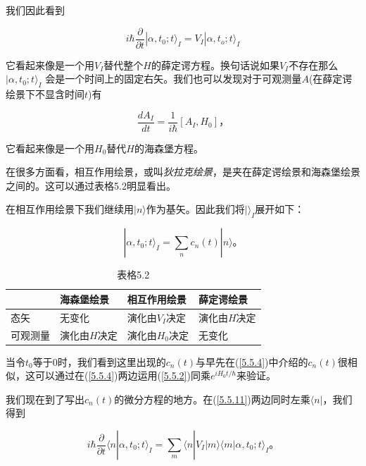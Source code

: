 ﻿\documentclass[UTF8,twoside]{ctexart}
\begin{document}
\noindent 我们因此看到

\begin{equation} \label{5.5.11}
i\hbar\dfrac{\partial}{\partial t}|\alpha,t_0;t\rangle_I=V_I|\alpha,t_o;t\rangle_I
\end{equation}

\noindent 它看起来像是一个用$V_I$替代整个$H$的薛定谔方程。换句话说如果$V_I$不存在那么$|\alpha,t_0;t\rangle_I$ 会是一个时间上的固定右矢。我们也可以发现对于可观测量$A$(在薛定谔绘景下不显含时间$t$)有

\begin{equation} \label{5.5.12}
\dfrac{dA_I}{dt}=\dfrac{1}{i\hbar}[A_I,H_0]\text{，}
\end{equation}

\noindent 它看起来像是一个用$H_0$替代$H$的海森堡方程。

在很多方面看，相互作用绘景，或叫\emph{狄拉克绘景}，是夹在薛定谔绘景和海森堡绘景之间的。这可以通过表格5.2明显看出。

在相互作用绘景下我们继续用$|n\rangle$作为基矢。因此我们将$|\rangle_I$展开如下：

\begin{equation} \label{5.5.13}
|\alpha,t_0;t\rangle_I=\displaystyle\sum_n c_n(t)|n\rangle\text{。}
\end{equation}

\begin{centering}
\begin{table}[!hbp]
\begin{tabular}{p{1.8cm}p{2.7cm}p{2.7cm}p{2.7cm}}
\hline
 & \textbf{海森堡绘景}& \textbf{相互作用绘景}& \textbf{薛定谔绘景}\\
\hline
态矢 & 无变化 & 演化由$V_I$决定 & 演化由$H$决定 \\
可观测量 & 演化由$H$决定 & 演化由$H_0$决定 & 无变化 \\
\hline
\end{tabular}
\caption{表格5.2}
\end{table}
\end{centering}

\noindent 当令$t_0$等于0时，我们看到这里出现的$c_n(t)$与早先在(\ref{5.5.4})中介绍的$c_n(t)$很相似，这可以通过在(\ref{5.5.4})两边运用(\ref{5.5.2})同乘$e^{iH_0 t/\hbar}$来验证。

我们现在到了写出$c_n(t)$的微分方程的地方。在(\ref{5.5.11})两边同时左乘$\langle n|$，我们得到

\begin{equation} \label{5.5.14}
i\hbar\dfrac{\partial}{\partial t}\langle n|\alpha,t_0;t\rangle_I=\displaystyle\sum_m \langle n|V_I|m\rangle\langle m|\alpha,t_0;t\rangle_I\text{。}
\end{equation}
\end{document}
